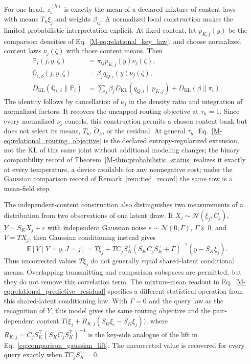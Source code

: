 \documentclass[twoside,11pt]{article}
\begin{document}
For one head, $z_i^{(h)}$ is exactly the mean of a declared mixture of content laws with means $T_h\xi_j$ and weights $\beta_{ij}$. A normalized local construction makes the limited probabilistic interpretation explicit. At fixed context, let $p_{K,j}(y)$ be the comparison densities of Eq.~\eqref{M-eq:relational_key_law}, and choose normalized content laws $\nu_j(\zeta)$ with those content means. Then
\begin{align}
\mathbb P_i(j,y,\zeta)&=\pi_{ij}p_{K,j}(y)\nu_j(\zeta),\\
\mathbb Q_{i,\beta}(j,y,\zeta)&=\beta_jq_{Q,i}(y)\nu_j(\zeta),\\
D_{\mathrm{KL}}(\mathbb Q_{i,\beta}\|\mathbb P_i)
&=\sum_j\beta_jD_{\mathrm{KL}}(q_{Q,i}\|p_{K,j})
+D_{\mathrm{KL}}(\beta\|\pi_i).
\label{eq:relational_normalized_model}
\end{align}
The identity follows by cancellation of $\nu_j$ in the density ratio and integration of normalized factors. It recovers the uncapped routing objective at $\tau_h=1$. Since every normalized $\nu_j$ cancels, this construction permits a chosen content bank but does not select its means, $T_h$, $\widetilde O_h$, or the residual. At general $\tau_h$, Eq.~\eqref{M-eq:relational_routing_objective} is the declared entropy-regularized extension, not the KL of this same joint without additional modeling changes; the binary compatibility record of Theorem~\ref{M-thm:probabilistic_status} realizes it exactly at every temperature, a device available for any nonnegative cost; under the Gaussian comparison record of Remark~\ref{rem:tied_record} the same row is a mean-field step.

The independent-content construction also distinguishes two measurements of a distribution from two observations of one latent draw. If $X_j\sim\mathcal N(\xi_j,C_j)$, $Y=S_KX_j+\varepsilon$ with independent Gaussian noise $\varepsilon\sim\mathcal N(0,\Gamma)$, $\Gamma\succeq0$, and $V=T X_j$, then Gaussian conditioning instead gives \citep{petersen2012matrix}
\begin{equation}
\mathbb E[V\mid Y=y,J=j]
=T\xi_j+TC_jS_K^\top(S_KC_jS_K^\top+\Gamma)^{-1}(y-S_K\xi_j).
\label{eq:relational_shared_latent_correction}
\end{equation}
Thus uncorrected values $T\xi_j$ do not generally equal shared-latent conditional means. Overlapping transmitting and comparison subspaces are permitted, but they do not remove this correlation term. The mixture-mean readout in Eq.~\eqref{M-eq:relational_predictive_residual} specifies a different statistical operation from this shared-latent conditioning law. With $\Gamma=0$ and the query law as the recognition of $Y$, this model gives the same routing objective and the pair-dependent content $T\bigl(\xi_j+R_{K,j}(S_Q\xi_i-S_K\xi_j)\bigr)$, where $R_{K,j}=C_jS_K^\top(S_KC_jS_K^\top)^{-1}$ is the key-side analogue of the lift in Eq.~\eqref{eq:comparison_gaussian_lift}. The uncorrected value is recovered for every query exactly when $TC_jS_K^\top=0$.
\end{document}
